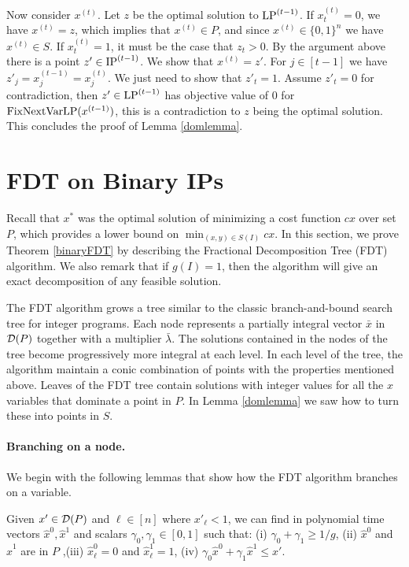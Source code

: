 Now consider $x^{(t)}$. Let $z$ be the optimal solution to $\operatorname{LP}^{(t-1)}$. If $x^{(t)}_t = 0$, we have $x^{(t)} = z$, which implies that $x^{(t)}\in P$, and since $x^{(t)}\in \{0,1\}^n$ we have $x^{(t)}\in S$. If $x^{(t)}_t =1$, it must be the case that $z_t > 0$. By the argument above there is a point $z'\in \operatorname{IP}^{(t-1)}$. We show that $x^{(t)} = z'$. For $j\in [t-1]$ we have $z'_j= x_j^{(t-1)}=x_j^{(t)}$. We just need to show that $z'_t = 1$. Assume $z'_t	 = 0$ for contradiction, then $z'\in \operatorname{LP}^{(t-1)}$ has objective value of $0$ for $\operatorname{{{FixNextVarLP}}}(x^{(t-1)})$, this is a contradiction to $z$ being the optimal solution. This concludes the proof of Lemma \ref{domlemma}. 





\section{FDT on Binary IPs}
\label{sec:binaryfdt}
Recall that $x^*$ was the optimal solution of minimizing a cost function $cx$ over set $P$, which provides a lower bound on $\min_{(x,y)\in S(I)} cx$.  In this section, we prove Theorem \ref{binaryFDT} by describing the Fractional Decomposition Tree (FDT) algorithm. We also remark that if $g(I)=1$, then the algorithm will give an exact decomposition of any feasible solution. 


The FDT algorithm grows a tree similar to the classic branch-and-bound search tree for integer programs. Each node represents a partially integral vector $\bar{x}$ in $\operatorname{\mathcal{D}}(P)$ together with a multiplier $\bar{\lambda}$. The solutions contained in the nodes of the tree become progressively more integral at each level. In each level of the tree, the algorithm maintain a conic combination of points with the properties mentioned above. Leaves of the FDT tree contain solutions with integer values for all the $x$ variables that dominate a point in $P$. In Lemma  \ref{domlemma} we saw how to turn these into points in $S$. 

\paragraph{Branching on a node.}
We begin with the following lemmas that show how the FDT algorithm branches on a variable.
\begin{lemma}\label{LPClemma}
	Given $x'\in \operatorname{\mathcal{D}}(P)$ and $\ell\in [n]$ where $x'_{\ell}<1$, we can find in polynomial time vectors $\hat{x}^0,\hat{x}^1$ and scalars $\gamma_0,\gamma_1 \in [0,1]$ such that: (i) $\gamma_0 + \gamma_1  \geq 1/g$, (ii) $\hat{x}^0$ and $\hat{x}^1$ are in  $ P$
	,(iii) $\hat{x}^0_\ell=0$ and $\hat{x}^1_\ell=1$, (iv) $\gamma_0 \hat{x}^0 + \gamma_1\hat{x}^1 \leq x'$.
\end{lemma}


